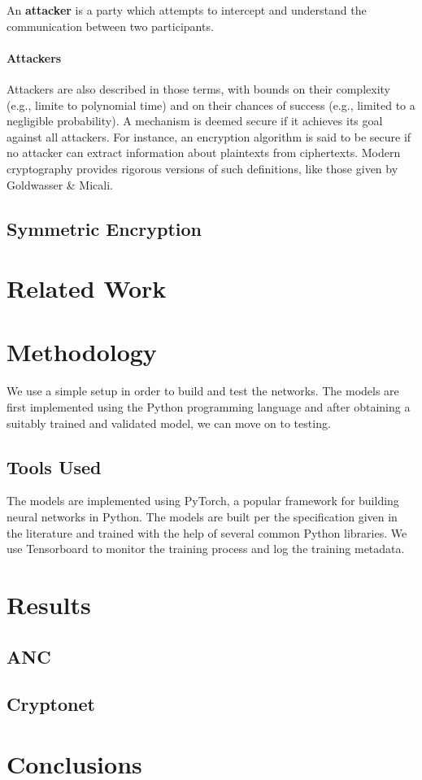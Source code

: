 \documentclass{proc}
\begin{document}
    An {\bf attacker} is a party which attempts to intercept and understand the
    communication between two participants.
  
  \paragraph{Attackers}
  Attackers are also described in those terms, with bounds on their complexity 
  (e.g., limite to polynomial time) and on their chances of success 
  (e.g., limited to a negligible probability). A mechanism is deemed secure if 
  it achieves its goal against all attackers. For instance, an encryption
  algorithm is said to be secure if no attacker can extract information about 
  plaintexts from ciphertexts.
  Modern cryptography provides rigorous versions of such definitions, like those 
  given by Goldwasser \& Micali. \cite{Goldwasser}

    \subsection{Symmetric Encryption}
    

  
  \section{Related Work}
  
  \section{Methodology}
  We use a simple setup in order to build and test the networks. The models are 
  first implemented using the Python programming language and after obtaining a 
  suitably trained and validated model, we can move on to testing. 

    \subsection{Tools Used}
    The models are implemented using PyTorch, a popular framework for building
    neural networks in Python. The models are built per the specification given in
    the literature and trained with the help of several common Python libraries.
    We use Tensorboard to monitor the training process and log the training metadata.

  
  \section{Results}
    \subsection{ANC}
    \subsection{Cryptonet}
  
  \section{Conclusions}

  
  
\end{document}
